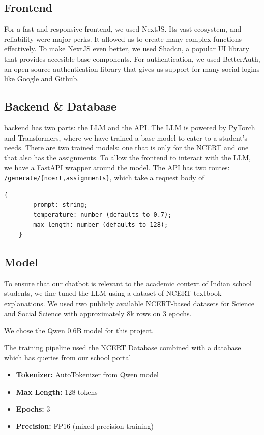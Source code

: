 \documentclass[9pt,a4paper,twocolumn,twoside]{tau-class/tau}
\begin{document}
\subsection{Frontend}
For a fast and responsive frontend, we used NextJS. Its vast ecosystem, and reliability were major perks. It allowed us to create many complex functions effectively. To make NextJS even better, we used Shadcn, a popular UI library that provides accesible base components. For authentication, we used BetterAuth, an open-source authentication library that gives us support for many social logins like Google and Github.

\subsection{Backend \& Database}
backend has two parts: the LLM and the API. The LLM is powered by PyTorch and Transformers, where we have trained a base model to cater to a student's needs. There are two trained models: one that is only for the NCERT and one that also has the assignments. To allow the frontend to interact with the LLM, we have a FastAPI wrapper around the model. The API has two routes: \verb|/generate/{ncert,assignments}|, which take a request body of \begin{lstlisting}[language=TeX, caption=Request Body for /generate/*]
	{
		prompt: string;
		temperature: number (defaults to 0.7);
		max_length: number (defaults to 128);
	}
\end{lstlisting}
\subsection{Model}
To ensure that our chatbot is relevant to the academic context of Indian school students, we fine-tuned the LLM using a dataset of NCERT textbook explanations. We used two publicly available NCERT-based datasets for \href{https://huggingface.co/datasets/KadamParth/NCERT_Science_9th}{Science} and \href{https://huggingface.co/datasets/KadamParth/NCERT_Social_Studies_9th}{Social Science} with approximately 8k rows on 3 epochs.

We chose the Qwen 0.6B model for this project.

The training pipeline used the NCERT Database combined with a database which has queries from our school portal
\begin{itemize}
	\item \textbf{Tokenizer:} AutoTokenizer from Qwen model
	\item \textbf{Max Length:} 128 tokens
	\item \textbf{Epochs:} 3
	\item \textbf{Precision:} FP16 (mixed-precision training)
\end{itemize}
\end{document}
